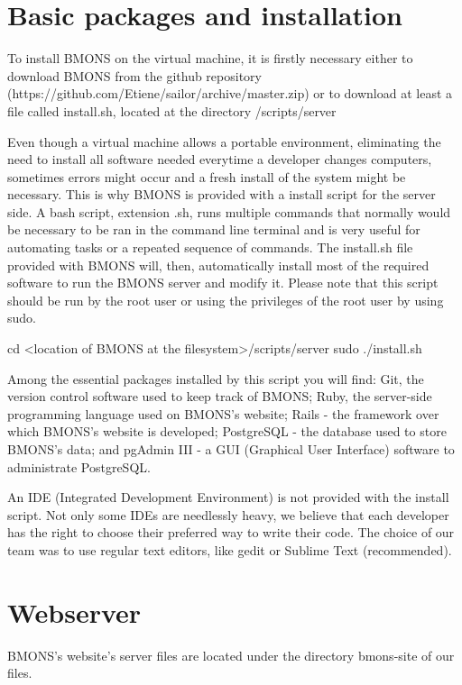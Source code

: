 \section{Basic packages and installation}

To install BMONS on the virtual machine, it is firstly necessary either to download BMONS from the github repository (https://github.com/Etiene/sailor/archive/master.zip)
or to download at least a file called install.sh, located at the directory /scripts/server

Even though a virtual machine allows a portable environment, eliminating the need to install all software needed everytime a developer changes computers, sometimes errors might occur and a fresh install of the system might be necessary. This is why BMONS is provided with a install script for the server side. A bash script, extension .sh, runs multiple commands that normally would be necessary to be ran in the command line terminal and is very useful for automating tasks or a repeated sequence of commands. The install.sh file provided with BMONS will, then, automatically install most of the required software to run the BMONS server and modify it. Please note that this script should be run by the root user or using the privileges of the root user by using sudo.

cd <location of BMONS at the filesystem>/scripts/server
sudo ./install.sh

Among the essential packages installed by this script you will find: Git, the version control software used to keep track of BMONS; Ruby, the server-side programming language used on BMONS's website; Rails - the framework over which BMONS's website is developed; PostgreSQL - the database used to store BMONS's data; and pgAdmin III - a GUI (Graphical User Interface) software to administrate PostgreSQL.

An IDE (Integrated Development Environment) is not provided with the install script. Not only some IDEs are needlessly heavy, we believe that each developer has the right to choose their preferred way to write their code. The choice of our team was to use regular text editors, like gedit or Sublime Text (recommended).

\section{Webserver}

BMONS's website's server files are located under the directory bmons-site of our files. 

